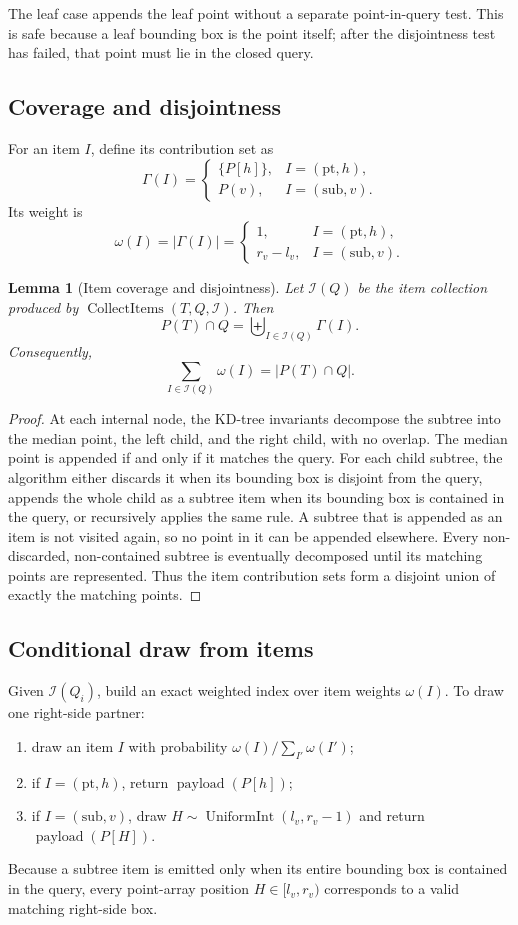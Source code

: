 \documentclass[11pt]{article}
\theoremstyle{definition}
\theoremstyle{plain}
\newtheorem{lemma}{Lemma}[section]
\theoremstyle{remark}
\DeclareMathOperator{\CollectItems}{CollectItems}
\DeclareMathOperator{\UniformInt}{UniformInt}
\DeclareMathOperator{\payload}{payload}
\newcommand{\Items}{\mathcal I}
\newcommand{\pt}{\mathrm{pt}}
\newcommand{\sub}{\mathrm{sub}}
\begin{document}
The leaf case appends the leaf point without a separate point-in-query test.  This is safe
because a leaf bounding box is the point itself; after the disjointness test has failed, that
point must lie in the closed query.

\subsection{Coverage and disjointness}

For an item $I$, define its contribution set as
\[
  \Gamma(I)=
  \begin{cases}
    \{P[h]\}, & I=(\pt,h),\\
    P(v), & I=(\sub,v).
  \end{cases}
\]
Its weight is
\[
  \omega(I)=|\Gamma(I)|=
  \begin{cases}
    1, & I=(\pt,h),\\
    r_v-l_v, & I=(\sub,v).
  \end{cases}
\]

\begin{lemma}[Item coverage and disjointness]
Let $\Items(Q)$ be the item collection produced by $\CollectItems(T,Q,\Items)$.  Then
\[
  P(T)\cap Q = \biguplus_{I\in\Items(Q)} \Gamma(I).
\]
Consequently,
\[
  \sum_{I\in\Items(Q)}\omega(I)=|P(T)\cap Q|.
\]
\end{lemma}

\begin{proof}
At each internal node, the KD-tree invariants decompose the subtree into the median point,
the left child, and the right child, with no overlap.  The median point is appended if and
only if it matches the query.  For each child subtree, the algorithm either discards it when
its bounding box is disjoint from the query, appends the whole child as a subtree item when
its bounding box is contained in the query, or recursively applies the same rule.  A subtree
that is appended as an item is not visited again, so no point in it can be appended elsewhere.
Every non-discarded, non-contained subtree is eventually decomposed until its matching points
are represented.  Thus the item contribution sets form a disjoint union of exactly the
matching points.
\end{proof}

\subsection{Conditional draw from items}

Given $\Items(Q_i)$, build an exact weighted index over item weights $\omega(I)$.  To draw
one right-side partner:
\begin{enumerate}[leftmargin=2em]
  \item draw an item $I$ with probability $\omega(I)/\sum_{I'}\omega(I')$;
  \item if $I=(\pt,h)$, return $\payload(P[h])$;
  \item if $I=(\sub,v)$, draw $H\sim\UniformInt(l_v,r_v-1)$ and return $\payload(P[H])$.
\end{enumerate}
Because a subtree item is emitted only when its entire bounding box is contained in the query,
every point-array position $H\in[l_v,r_v)$ corresponds to a valid matching right-side box.
\end{document}
